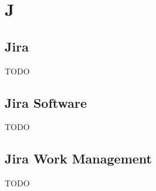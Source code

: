 \section{J}

\vspace{2em}
\subsection*{Jira}
TODO

\vspace{2em}
\subsection*{Jira Software}
TODO

\vspace{2em}
\subsection*{Jira Work Management}
TODO